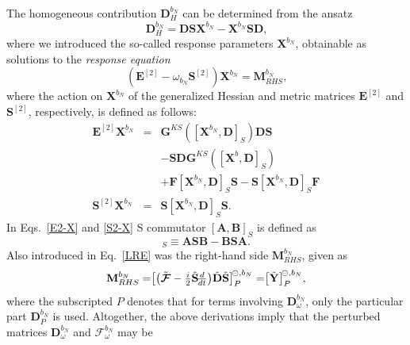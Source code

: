 \documentclass[%
 reprint,
 amsmath,amssymb,
 aps,
]{revtex4-1}
\begin{document}
The homogeneous contribution $\mathbf{D}_{H}^{b_N}$ can be determined from the
ansatz 
\begin{equation}\label{D-H-bn}
\mathbf{D}_{H}^{b_N} = \mathbf{D} \mathbf{S} \mathbf{X}^{b_N} - \mathbf{X}^{b_N} \mathbf{S} \mathbf{D} \text{,}
\end{equation}
where we introduced the so-called response parameters $\mathbf{X}^{b_N}$,
obtainable as solutions to the \textit{response equation}
\begin{equation}
\label{LRE}
(\mathbf{E}^{[2]} - \omega_{b_N} \mathbf{S}^{[2]}) \mathbf{X}^{b_N} = \mathbf{M}_{RHS}^{b_N}\text{,}
\end{equation}
where the action on $\mathbf{X}^{b_N}$ of the generalized Hessian and metric
matrices $\mathbf{E}^{[2]}$ and $\mathbf{S}^{[2]}$, respectively, is defined as
follows:
\begin{eqnarray}\label{E2-X}
\mathbf{E}^{[2]} \mathbf{X}^{b_{N}} &=&
\mathbf{G}^{KS}([\mathbf{X}^{b_{N}}, \mathbf{D}]_S) \mathbf{D} \mathbf{S}
\\ \nonumber && - \mathbf{S} \mathbf{D} \mathbf{G}^{KS}([\mathbf{X}^b, \mathbf{D}]_S)
\\ \nonumber && +
\mathbf{F} [\mathbf{X}^{b_{N}},\mathbf{D}]_S \mathbf{S}
- \mathbf{S} [\mathbf{X}^{b_{N}},\mathbf{D}]_S \mathbf{F}
\\ \label{S2-X}
\mathbf{S}^{[2]} \mathbf{X}^{b_{N}} &=&
\mathbf{S} [\mathbf{X}^{b_{N}},\mathbf{D}]_S \mathbf{S} \text{.}
\end{eqnarray}
In Eqs.~\eqref{E2-X} and \eqref{S2-X} S commutator $[\mathbf{A}, \mathbf{B}]_S$
is defined as
\begin{equation}
[\mathbf{A}, \mathbf{B}]_S \equiv \mathbf{ASB} - \mathbf{BSA}\text{.}
\end{equation}
Also introduced in Eq.~\eqref{LRE} was the right-hand side
$\mathbf{M}_{RHS}^{b_N}$, given as
\begin{eqnarray}\label{MRHS}
\mathbf{M}_{RHS}^{b_N} = \bigr[\bigl(\tilde{\mbox{\boldmath $ \mathcal{F} $}} - {\textstyle \frac{i}{2}} \tilde{\mathbf{S}}
\!{\textstyle \frac{d}{dt}} \bigr) \tilde{\mathbf{D}} \tilde{\mathbf{S}} \bigr]^{\negmedspace \circleddash, b_N}_{ P } = \bigr[ \tilde{\mathbf{Y}} \bigr]^{\negmedspace \circleddash, b_N}_{ P } \text{,}
\end{eqnarray}
where the subscripted $P$ denotes that for terms involving
$\mathbf{D}^{b_N}_{\omega}$, only the particular part $\mathbf{D}^{b_N}_{P}$ is
used. Altogether, the above derivations imply that the perturbed matrices
$\mathbf{D}^{b_N}_{\omega}$ and $\bm{\mathcal{F}}^{b_{N}}_{\omega}$ may be
\end{document}
